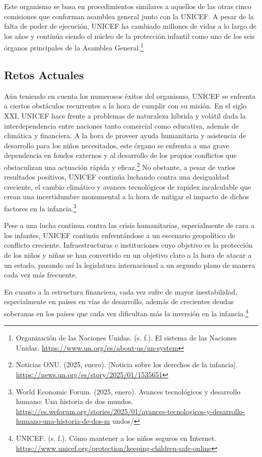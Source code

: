 Este organismo se basa en procedimientos similares a aquellos de las otras cinco comisiones que conforman asamblea general junto con la UNICEF. A pesar de la falta de poder de ejecución, UNICEF ha cambiado millones de vidas a lo largo de los años y continúa siendo el núcleo de la protección infantil como uno de los seis órganos principales de la Asamblea General.\footnote{Organización de las Naciones Unidas. (s. f.). El sistema de las Naciones Unidas. \url{https://www.un.org/es/about-us/un-system}}

\subsection{Retos Actuales}

Aún teniendo en cuenta los numerosos éxitos del organismo, UNICEF se enfrenta a ciertos obstáculos recurrentes a la hora de cumplir con su misión. En el siglo XXI, UNICEF hace frente a problemas de naturaleza híbrida y volátil dada la interdependencia entre naciones tanto comercial como educativa, además de climática y financiera. A la hora de proveer ayuda humanitaria y asistencia de desarrollo para los niños necesitados, este órgano se enfrenta a una grave dependencia en fondos externos y al desarrollo de los propios conflictos que obstaculizan una actuación rápida y eficaz.\footnote{Noticias ONU. (2025, enero). [Noticia sobre los derechos de la infancia]. \url{https://news.un.org/es/story/2025/01/1535651}} No obstante, a pesar de varios resultados positivos, UNICEF continúa luchando contra una desigualdad creciente, el cambio climático y avances tecnológicos de rapidez incalculable que crean una incertidumbre monumental a la hora de mitigar el impacto de dichos factores en la infancia.\footnote{World Economic Forum. (2025, enero). Avances tecnológicos y desarrollo humano: Una historia de dos mundos. \url{https://es.weforum.org/stories/2025/01/avances-tecnologicos-y-desarrollo-humano-una-historia-de-dos-m} undos/}

Pese a una lucha continua contra las crisis humanitarias, especialmente de cara a los infantes, UNICEF continúa enfrentándose a un escenario geopolítico de conflicto creciente. Infraestructuras e instituciones cuyo objetivo es la protección de los niños y niñas se han convertido en un objetivo claro a la hora de atacar a un estado, pasando así la legislatura internacional a un segundo plano de manera cada vez más frecuente.

En cuanto a la estructura financiera, cada vez sufre de mayor inestabilidad, especialmente en países en vías de desarrollo, además de crecientes deudas soberanas en los países que cada vez dificultan más la inversión en la infancia.\footnote{UNICEF. (s. f.). Cómo mantener a los niños seguros en Internet. \url{https://www.unicef.org/protection/keeping-children-safe-online}}

